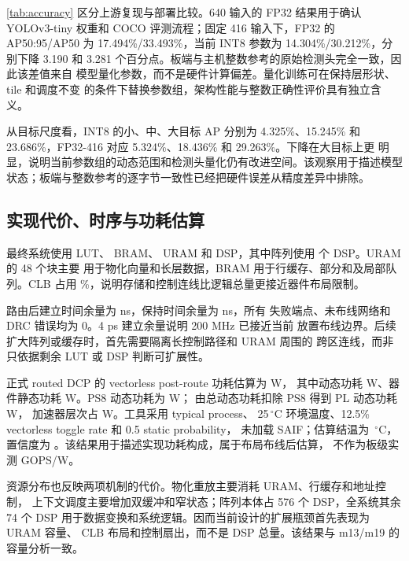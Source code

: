 

\cref{tab:accuracy} 区分上游复现与部署比较。640 输入的 FP32 结果用于确认
YOLOv3-tiny 权重和 COCO 评测流程；固定 416 输入下，FP32 的 AP50:95/AP50 为
17.494\%/33.493\%，当前 INT8 参数为 14.304\%/30.212\%，分别下降 3.190 和
3.281 个百分点。板端与主机整数参考的原始检测头完全一致，因此该差值来自
模型量化参数，而不是硬件计算偏差。量化训练可在保持层形状、tile 和调度不变
的条件下替换参数组，架构性能与整数正确性评价具有独立含义。

从目标尺度看，INT8 的小、中、大目标 AP 分别为 4.325\%、15.245\% 和
23.686\%，FP32-416 对应 5.324\%、18.436\% 和 29.263\%。下降在大目标上更
明显，说明当前参数组的动态范围和检测头量化仍有改进空间。该观察用于描述模型
状态；板端与整数参考的逐字节一致性已经把硬件误差从精度差异中排除。

\subsection{实现代价、时序与功耗估算}



最终系统使用 \LUTCount{} LUT、\BRAMCount{} BRAM、\URAMCount{} URAM 和
\DSPCount{} DSP，其中阵列使用 \ArrayDSPCount{} 个 DSP。URAM 的 48 个块主要
用于物化向量和长层数据，BRAM 用于行缓存、部分和及局部队列。CLB 占用
\CLBPercent{}\%，说明存储和控制连线比逻辑总量更接近器件布局限制。

路由后建立时间余量为 \WNSValue{} ns，保持时间余量为 \WHSValue{} ns，所有
失败端点、未布线网络和 DRC 错误均为 0。4 ps 建立余量说明 200 MHz 已接近当前
放置布线边界。后续扩大阵列或缓存时，首先需要隔离长控制路径和 URAM 周围的
跨区连线，而非只依据剩余 LUT 或 DSP 判断可扩展性。

正式 routed DCP 的 vectorless post-route 功耗估算为 \PostRoutePowerTotalW{} W，
其中动态功耗 \PostRoutePowerDynamicW{} W、器件静态功耗
\PostRoutePowerStaticW{} W。PS8 动态功耗为 \PostRoutePowerPSDynamicW{} W；
由总动态功耗扣除 PS8 得到 PL 动态功耗 \PostRoutePowerPLDynamicW{} W，
加速器层次占 \PostRoutePowerAccelDynamicW{} W。工具采用 typical process、
25\,$^\circ$C 环境温度、12.5\% vectorless toggle rate 和 0.5 static probability，
未加载 SAIF；估算结温为 \PostRoutePowerJunctionC{}\,$^\circ$C，置信度为
\PostRoutePowerConfidence{}。该结果用于描述实现功耗构成，属于布局布线后估算，
不作为板级实测 GOPS/W。

资源分布也反映两项机制的代价。物化重放主要消耗 URAM、行缓存和地址控制，
上下文调度主要增加双缓冲和窄状态；阵列本体占 576 个 DSP，全系统其余 74 个
DSP 用于数据变换和系统逻辑。因而当前设计的扩展瓶颈首先表现为 URAM 容量、
CLB 布局和控制扇出，而不是 DSP 总量。该结果与 m13/m19 的容量分析一致。

